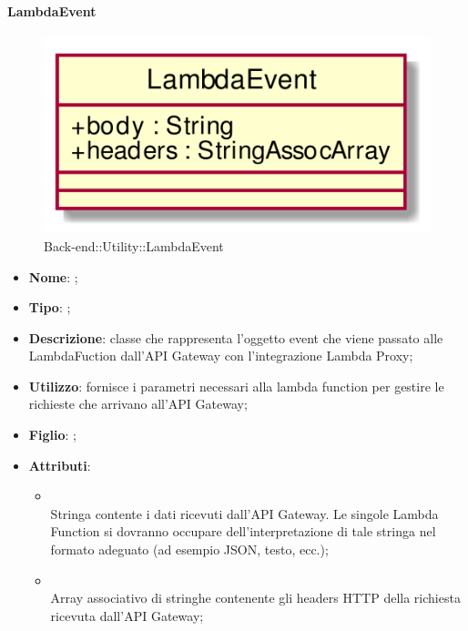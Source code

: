 \hypertarget{LambdaEvent_label}{\paragraph{LambdaEvent}}
\begin{figure}[h]
	\centering
	\includegraphics[width=\textwidth,height=\textheight,keepaspectratio]{images/ClassLambdaEvent.png}
	\caption{Back-end::Utility::LambdaEvent}
\end{figure}
\begin{itemize}
	\item \textbf{Nome}: ;
	\item \textbf{Tipo}: ;
	\item \textbf{Descrizione}: classe che rappresenta l'oggetto event che viene passato alle LambdaFuction dall'API Gateway con l'integrazione Lambda Proxy;
	\item \textbf{Utilizzo}: fornisce i parametri necessari alla lambda function per gestire le richieste che arrivano all'API Gateway;
	\item \textbf{Figlio}: ;
	\item \textbf{Attributi}:
	\begin{itemize}
		\item[]  \\
		Stringa contente i dati ricevuti dall'API Gateway. Le singole Lambda  Function si dovranno occupare dell'interpretazione di tale stringa nel formato adeguato (ad esempio JSON, testo, ecc.);
		\item[]  \\
		Array associativo di stringhe contenente gli headers HTTP della richiesta ricevuta dall'API Gateway;
	\end{itemize}
\end{itemize}
\FloatBarrier

